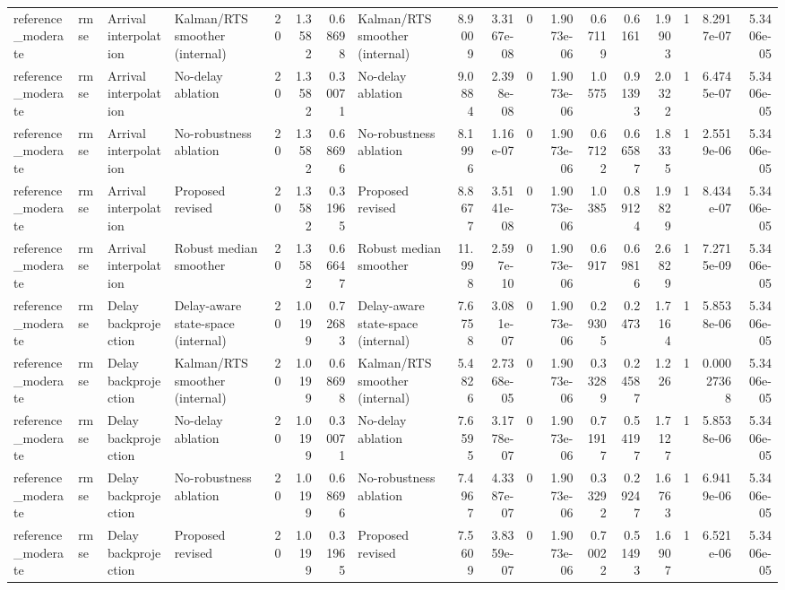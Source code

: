 \begin{table}[!htbp]
{\begin{tabular}{llllrrrlrrrrrrrrrr}
reference_moderate & rmse & Arrival interpolation & Kalman/RTS smoother (internal) & 20 & 1.3582 & 0.68698 & Kalman/RTS smoother (internal) & 8.9009 & 3.3167e-08 & 0 & 1.9073e-06 & 0.67119 & 0.6161 & 1.9903 & 1 & 8.2917e-07 & 5.3406e-05 \\
reference_moderate & rmse & Arrival interpolation & No-delay ablation & 20 & 1.3582 & 0.30071 & No-delay ablation & 9.0884 & 2.398e-08 & 0 & 1.9073e-06 & 1.0575 & 0.91393 & 2.0322 & 1 & 6.4745e-07 & 5.3406e-05 \\
reference_moderate & rmse & Arrival interpolation & No-robustness ablation & 20 & 1.3582 & 0.68696 & No-robustness ablation & 8.1996 & 1.16e-07 & 0 & 1.9073e-06 & 0.67122 & 0.66587 & 1.8335 & 1 & 2.5519e-06 & 5.3406e-05 \\
reference_moderate & rmse & Arrival interpolation & Proposed revised & 20 & 1.3582 & 0.31965 & Proposed revised & 8.8677 & 3.5141e-08 & 0 & 1.9073e-06 & 1.0385 & 0.89124 & 1.9829 & 1 & 8.434e-07 & 5.3406e-05 \\
reference_moderate & rmse & Arrival interpolation & Robust median smoother & 20 & 1.3582 & 0.66647 & Robust median smoother & 11.998 & 2.597e-10 & 0 & 1.9073e-06 & 0.6917 & 0.69816 & 2.6829 & 1 & 7.2715e-09 & 5.3406e-05 \\
reference_moderate & rmse & Delay backprojection & Delay-aware state-space (internal) & 20 & 1.0199 & 0.72683 & Delay-aware state-space (internal) & 7.6758 & 3.081e-07 & 0 & 1.9073e-06 & 0.29305 & 0.2473 & 1.7164 & 1 & 5.8538e-06 & 5.3406e-05 \\
reference_moderate & rmse & Delay backprojection & Kalman/RTS smoother (internal) & 20 & 1.0199 & 0.68698 & Kalman/RTS smoother (internal) & 5.4826 & 2.7368e-05 & 0 & 1.9073e-06 & 0.33289 & 0.24587 & 1.226 & 1 & 0.00027368 & 5.3406e-05 \\
reference_moderate & rmse & Delay backprojection & No-delay ablation & 20 & 1.0199 & 0.30071 & No-delay ablation & 7.6595 & 3.1778e-07 & 0 & 1.9073e-06 & 0.71917 & 0.54197 & 1.7127 & 1 & 5.8538e-06 & 5.3406e-05 \\
reference_moderate & rmse & Delay backprojection & No-robustness ablation & 20 & 1.0199 & 0.68696 & No-robustness ablation & 7.4967 & 4.3387e-07 & 0 & 1.9073e-06 & 0.33292 & 0.29247 & 1.6763 & 1 & 6.9419e-06 & 5.3406e-05 \\
reference_moderate & rmse & Delay backprojection & Proposed revised & 20 & 1.0199 & 0.31965 & Proposed revised & 7.5609 & 3.8359e-07 & 0 & 1.9073e-06 & 0.70022 & 0.51493 & 1.6907 & 1 & 6.521e-06 & 5.3406e-05 \\

\end{tabular}}
\end{table}
